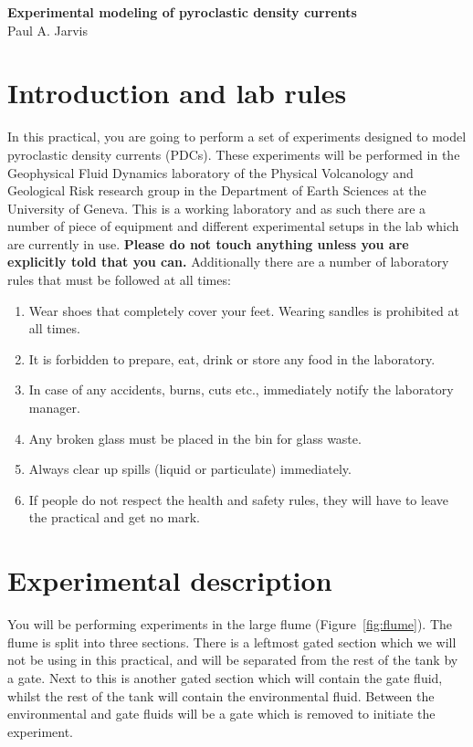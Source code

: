 \documentclass[]{article}
\theoremstyle{definition}
\begin{document}
\begin{center}
{\textbf{Experimental modeling of pyroclastic density currents}}\\
Paul A. Jarvis\\ %
\end{center}

\vspace{0.2 cm}

\section{Introduction and lab rules}
\label{sec:lab_rules}

In this practical, you are going to perform a set of experiments designed to model pyroclastic density currents (PDCs). These experiments will be performed in the Geophysical Fluid Dynamics laboratory of the Physical Volcanology and Geological Risk research group in the Department of Earth Sciences at the University of Geneva. This is a working laboratory and as such there are a number of piece of equipment and different experimental setups in the lab which are currently in use. \textbf{Please do not touch anything unless you are explicitly told that you can.} Additionally there are a number of laboratory rules that must be followed at all times:

\begin{enumerate}
\item Wear shoes that completely cover your feet. Wearing sandles is prohibited at all times.
\item It is forbidden to prepare, eat, drink or store any food in the laboratory.
\item In case of any accidents, burns, cuts etc., immediately notify the laboratory manager.
\item Any broken glass must be placed in the bin for glass waste.
\item Always clear up spills (liquid or particulate) immediately.
\item If people do not respect the health and safety rules, they will have to leave the practical and get no mark.
\end{enumerate}

\section{Experimental description}
\label{sec:exp}

You will be performing experiments in the large flume (Figure~\ref{fig:flume}). The flume is split into three sections. There is a leftmost gated section which we will not be using in this practical, and will be separated from the rest of the tank by a gate. Next to this is another gated section which will contain the gate fluid, whilst the rest of the tank will contain the environmental fluid. Between the environmental and gate fluids will be a gate which is removed to initiate the experiment. 
\end{document}
